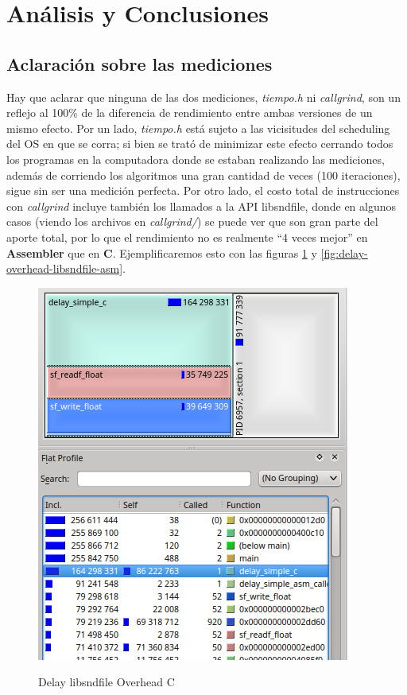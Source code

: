 \section{Análisis y Conclusiones}
\label{sec:analisis}

\subsection*{Aclaración sobre las mediciones}
Hay que aclarar que ninguna de las dos mediciones, \textit{tiempo.h} ni \textit{callgrind}, son un reflejo al 100\% de la diferencia de rendimiento entre ambas versiones de un mismo efecto. Por un lado, \textit{tiempo.h} está sujeto a las vicisitudes del scheduling del OS en que se corra; si bien se trató de minimizar este efecto cerrando todos los programas en la computadora donde se estaban realizando las mediciones, además de corriendo los algoritmos una gran cantidad de veces (100 iteraciones), sigue sin ser una medición perfecta. 
Por otro lado, el costo total de instrucciones con \textit{callgrind} incluye también los llamados a la API libsndfile, donde en algunos casos (viendo los archivos en \textit{callgrind/}) se puede ver que son gran parte del aporte total, por lo que el rendimiento no es realmente ``4 veces mejor'' en \textbf{Assembler} que en \textbf{C}. Ejemplificaremos esto con las figuras \ref{fig:delay-overhead-libsndfile} y \ref{fig:delay-overhead-libsndfile-asm}.

\begin{figure}[H]
    \centering
    \includegraphics[scale=0.68]{imagenes/delay-overhead-libsndfile.png}
    \label{fig:delay-overhead-libsndfile}
    \caption{Delay libsndfile Overhead C}
\end{figure}

